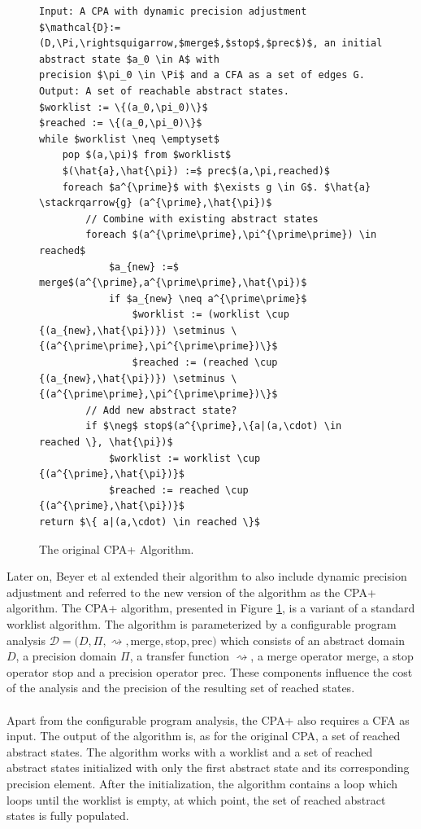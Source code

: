 \documentclass{kththesis}
\newcommand\stackrqarrow[1]{%
    \mathrel{\stackon[2pt]{$\rightsquigarrow$}{$\scriptscriptstyle#1$}}}
\begin{document}
\begin{figure}[thb]
    \centering
\begin{algorithmFrame}
\begin{lstlisting}[style=algorithm]
Input: A CPA with dynamic precision adjustment 
$\mathcal{D}:=(D,\Pi,\rightsquigarrow,$merge$,$stop$,$prec$)$, an initial abstract state $a_0 \in A$ with 
precision $\pi_0 \in \Pi$ and a CFA as a set of edges G.
Output: A set of reachable abstract states.
$worklist := \{(a_0,\pi_0)\}$
$reached := \{(a_0,\pi_0)\}$
while $worklist \neq \emptyset$
    pop $(a,\pi)$ from $worklist$
    $(\hat{a},\hat{\pi}) :=$ prec$(a,\pi,reached)$
    foreach $a^{\prime}$ with $\exists g \in G$. $\hat{a} \stackrqarrow{g} (a^{\prime},\hat{\pi})$
        // Combine with existing abstract states
        foreach $(a^{\prime\prime},\pi^{\prime\prime}) \in reached$
            $a_{new} :=$ merge$(a^{\prime},a^{\prime\prime},\hat{\pi})$
            if $a_{new} \neq a^{\prime\prime}$
                $worklist := (worklist \cup {(a_{new},\hat{\pi})}) \setminus \{(a^{\prime\prime},\pi^{\prime\prime})\}$
                $reached := (reached \cup {(a_{new},\hat{\pi})}) \setminus \{(a^{\prime\prime},\pi^{\prime\prime})\}$
        // Add new abstract state?
        if $\neg$ stop$(a^{\prime},\{a|(a,\cdot) \in reached \}, \hat{\pi})$
            $worklist := worklist \cup {(a^{\prime},\hat{\pi})}$
            $reached := reached \cup {(a^{\prime},\hat{\pi})}$
return $\{ a|(a,\cdot) \in reached \}$
\end{lstlisting}
\end{algorithmFrame}
\caption[The original CPA+ Algorithm.]{The original CPA+ Algorithm.}
    \label{fig:CPAOrig}
\end{figure}
\clearpage
\noindent
Later on, Beyer et al extended their algorithm to also include dynamic precision adjustment and referred to the new version of the algorithm as the CPA+ algorithm\cite{cpaPlusAlgo}. The CPA+ algorithm, presented in Figure \ref{fig:CPAOrig}, is a variant of a standard worklist algorithm. The algorithm is parameterized by a configurable program analysis $\mathcal{D} = (D,\Pi,\rightsquigarrow,$merge$,$stop$,$prec$)$ which consists of an abstract domain $D$, a precision domain $\Pi$, a transfer function $\rightsquigarrow$, a merge operator merge, a stop operator stop and a precision operator prec. These components influence the cost of the analysis and the precision of the resulting set of reached states.
\\ \\
Apart from the configurable program analysis, the CPA+ also requires a CFA as input. The output of the algorithm is, as for the original CPA, a set of reached abstract states. The algorithm works with a worklist and a set of reached abstract states initialized with only the first abstract state and its corresponding precision element. After the initialization, the algorithm contains a loop which loops until the worklist is empty, at which point, the set of reached abstract states is fully populated. 
\end{document}
